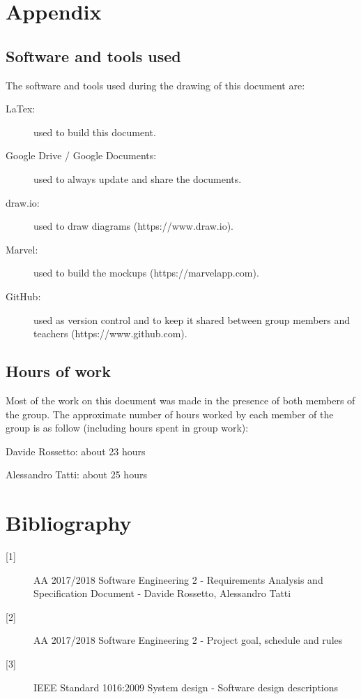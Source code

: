 \documentclass{article}
\begin{document}
	\newpage
	\appendix
	\section{Appendix}


	\subsection{Software and tools used}

	The software and tools used during the drawing of this document are:

	\begin{description}
	\item [LaTex:] used to build this document.
	\item [Google Drive / Google Documents:] used to always update and share the documents.
	\item [draw.io:] used to draw diagrams (https://www.draw.io).
	\item [Marvel:] used to build the mockups (https://marvelapp.com).
	\item [GitHub:] used as version control and to keep it shared between group members and teachers (https://www.github.com).
	\end{description}
	

	\subsection{Hours of work}

	Most of the work on this document was made in the presence of both members of the group. The approximate number of hours worked by each member of the group is as follow (including hours spent in group work):
	
	\bigskip
	Davide Rossetto: about 23 hours
	
	Alessandro Tatti: about 25 hours

	
	\section{Bibliography}
	
	\begin{description}
	\item [[1{]}] AA 2017/2018 Software Engineering 2 - Requirements Analysis and Specification Document - Davide Rossetto, Alessandro Tatti
	\item [[2{]}] AA 2017/2018 Software Engineering 2 - Project goal, schedule and rules
	\item [[3{]}] IEEE Standard 1016:2009 System design - Software design descriptions
	\end{description}
\end{document}
